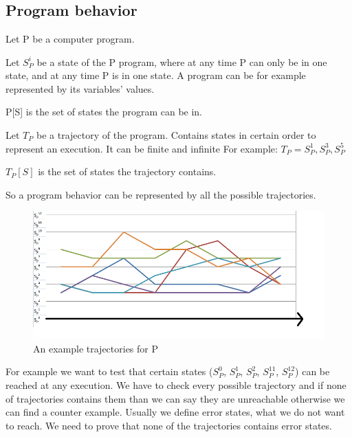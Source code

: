 \chapter{\saai}
\label{sec:saai}

\section{Program behavior}
\label{sec:progbehavior}

Let P be a computer program.

Let $S_{P}^{i}$ be a state of the P program, where at any time P can only be in one state, and at any time P is in one state. A program can be for example represented by its variables' values.

P[S] is the set of states the program can be in.

Let $T_{P}$ be a trajectory of the program. Contains states in certain order to represent an execution.
It can be finite and infinite For example: $T_{P}={S_{P}^{1}, S_{P}^{3}, S_{P}^{5}}$

$T_{P}[S]$ is the set of states the trajectory contains.

So a program behavior can be represented by all the possible trajectories.

\begin{figure} [!ht]
	\centering
	\includegraphics[width=150mm, keepaspectratio]{figures/trajectory1.png}
	\caption{\label{fig:trajectory1}An example trajectories for P}
\end{figure}

For example we want to test that certain states ($S_{P}^{0}$, $S_{P}^{1}$, $S_{P}^{2}$, $S_{P}^{11}$, $S_{P}^{12}$) can be reached at any execution. We have to check every possible trajectory and if none of trajectories contains them than we can say they are unreachable otherwise we can find a counter example. Usually we define error states, what we do not want to reach. We need to prove that none of the trajectories contains error states. 

